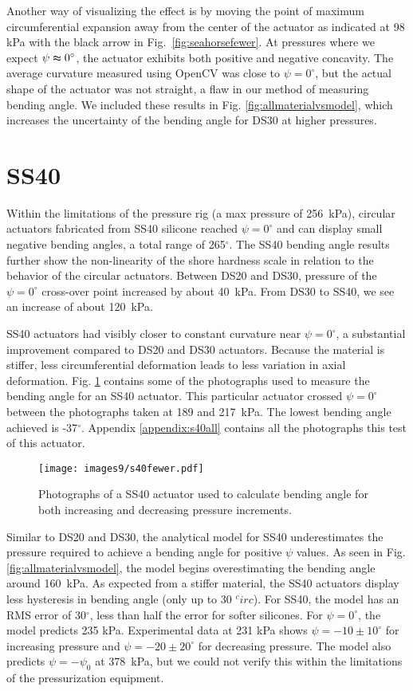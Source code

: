 Another way of visualizing the effect is by moving the point of maximum circumferential expansion away from the center of the actuator as indicated at 98 kPa with the black arrow in Fig.~\ref{fig:seahorsefewer}. At pressures where we expect $\psi\thickapprox0^\circ$, the actuator exhibits both positive and negative concavity. The average curvature measured using OpenCV was close to $\psi=0^\circ$, but the actual shape of the actuator was not straight, a flaw in our method of measuring bending angle. We included these results in Fig. \ref{fig:allmaterialvsmodel}, which increases the uncertainty of the bending angle for DS30 at higher pressures. 

\clearpage
\section{SS40}

Within the limitations of the pressure rig (a max pressure of 256~kPa), circular actuators fabricated from SS40 silicone reached $\psi=0^\circ$ and can display small negative bending angles, a total range of 265$^\circ$. 
The SS40 bending angle results further show the non-linearity of the shore hardness scale in relation to the behavior of the circular actuators. Between DS20 and DS30, pressure of the $\psi=0^\circ$ cross-over point increased by about 40~kPa. From DS30 to SS40, we see an increase of about 120~kPa. 

SS40 actuators had visibly closer to constant curvature near $\psi=0^\circ$, a substantial improvement compared to DS20 and DS30 actuators. Because the material is stiffer, less circumferential deformation leads to less variation in axial deformation. Fig. \ref{fig:ss40fewer} contains some of the photographs used to measure the bending angle for an SS40 actuator. This particular actuator crossed $\psi=0^\circ$ between the photographs taken at 189 and 217~kPa. The lowest bending angle achieved is -37$^\circ$. Appendix \ref{appendix:s40all} contains all the photographs this test of this actuator. 

\begin{figure}[!ht]
    \centering
     \texttt{[image: images9/s40fewer.pdf]}
    \caption{Photographs of a SS40 actuator used to calculate bending angle for both increasing and decreasing pressure increments.}
    \label{fig:ss40fewer}
\end{figure}

\clearpage
Similar to DS20 and DS30, the analytical model for SS40 underestimates the pressure required to achieve a bending angle for positive $\psi$ values. As seen in Fig. \ref{fig:allmaterialvsmodel}, the model begins overestimating the bending angle around 160~kPa. As expected from a stiffer material, the SS40 actuators display less hysteresis in bending angle (only up to 30 $^circ$). For SS40, the model has an RMS error of 30$^\circ$, less than half the error for softer silicones. For $\psi=0^\circ$, the model predicts 235 kPa. Experimental data at 231 kPa shows $\psi=-10\pm10^\circ$ for increasing pressure and $\psi=-20\pm20^\circ$ for decreasing pressure. The model also predicts $\psi=-\psi_0$ at 378~kPa, but we could not verify this within the limitations of the pressurization equipment. 

